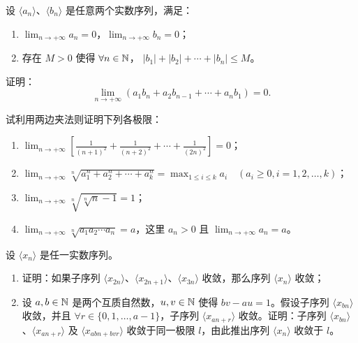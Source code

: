 \begin{exercise}
  \item 设 \(\langle a_n\rangle\)、\(\langle b_n\rangle\) 是任意两个实数序列，满足：
  \begin{enumerate}[label=\arabic*)]
    \item \(\displaystyle\lim_{n\to+\infty}a_n=0\)，\(\displaystyle\lim_{n\to+\infty}b_n=0\)；
    \item 存在 \(M>0\) 使得 \(\forall n\in\mathbb{N}\)，
    \(|b_1|+|b_2|+\cdots+|b_n|\leqslant M\)。
  \end{enumerate}
  证明：
  \[
  \lim_{n\to+\infty}(a_1b_n+a_2b_{n-1}+\cdots+a_nb_1)=0.
  \]
\end{exercise}

\begin{exercise}
  \item 试利用两边夹法则证明下列各极限：
  \begin{enumerate}[label=\arabic*)]
    \item \(\displaystyle\lim_{n\to+\infty}\left[\frac1{(n+1)^2}+\frac1{(n+2)^2}+\cdots+\frac1{(2n)^2}\right]=0\)；
    \item \(\displaystyle\lim_{n\to+\infty}\sqrt[n]{a_1^n+a_2^n+\cdots+a_k^n}=\max_{1\leqslant i\leqslant k}a_i\quad(a_i\geqslant0, i=1,2,\dots,k)\)；
    \item \(\displaystyle\lim_{n\to+\infty}\sqrt[n]{\sqrt[n]{n}-1}=1\)；
    \item \(\displaystyle\lim_{n\to+\infty}\sqrt[n]{a_1a_2\cdots a_n}=a\)，这里 \(a_n>0\) 且 \(\displaystyle\lim_{n\to+\infty}a_n=a\)。
  \end{enumerate}
\end{exercise}

\begin{exercise}
  \item 设 \(\langle x_n\rangle\) 是任一实数序列。
  \begin{enumerate}[label=\arabic*)]
    \item 证明：如果子序列 \(\langle x_{2n}\rangle\)、\(\langle x_{2n+1}\rangle\)、\(\langle x_{3n}\rangle\) 收敛，那么序列 \(\langle x_n\rangle\) 收敛；
    \item 设 \(a,b\in\mathbb{N}\) 是两个互质自然数，\(u,v\in\mathbb{N}\) 使得 \(bv-au=1\)。假设子序列 \(\langle x_{bn}\rangle\) 收敛，并且 \(\forall r\in\{0,1,\dots,a-1\}\)，子序列 \(\langle x_{an+r}\rangle\) 收敛。证明：子序列 \(\langle x_{bn}\rangle\)、\(\langle x_{an+r}\rangle\) 及 \(\langle x_{abn+bvr}\rangle\) 收敛于同一极限 \(l\)，由此推出序列 \(\langle x_n\rangle\) 收敛于 \(l\)。
  \end{enumerate}
\end{exercise}

